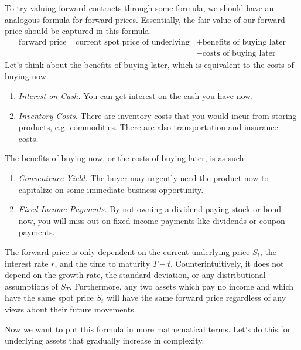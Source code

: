 \documentclass{article}
\begin{document}
    To try valuing forward contracts through some formula, we should have an analogous formula for forward prices. Essentially, the fair value of our forward price should be captured in this formula.  
    \begin{align*}
      \text{forward price } = \text{current spot price of underlying} & + \text{benefits of buying later} \\ 
                                                                       & - \text{costs of buying later}
    \end{align*}
    Let's think about the benefits of buying later, which is equivalent to the costs of buying now. 
    \begin{enumerate}
      \item \textit{Interest on Cash.} You can get interest on the cash you have now.  
      \item \textit{Inventory Costs.} There are inventory costs that you would incur from storing products, e.g. commodities. There are also transportation and insurance costs.  
    \end{enumerate}
    The benefits of buying now, or the costs of buying later, is as such: 
    \begin{enumerate}
      \item \textit{Convenience Yield.} The buyer may urgently need the product now to capitalize on some immediate business opportunity. 
      \item \textit{Fixed Income Payments.} By not owning a dividend-paying stock or bond now, you will miss out on fixed-income payments like dividends or coupon payments. 
    \end{enumerate}
    The forward price is only dependent on the current underlying price $S_t$, the interest rate $r$, and the time to maturity $T - t$. Counterintuitively, it does not depend on the growth rate, the standard deviation, or any distributional assumptions of $S_T$. Furthermore, any two assets which pay no income and which have the same spot price $S_t$ will have the same forward price regardless of any views about their future movements. 
  
    Now we want to put this formula in more mathematical terms. Let's do this for underlying assets that gradually increase in complexity. 
\end{document}
